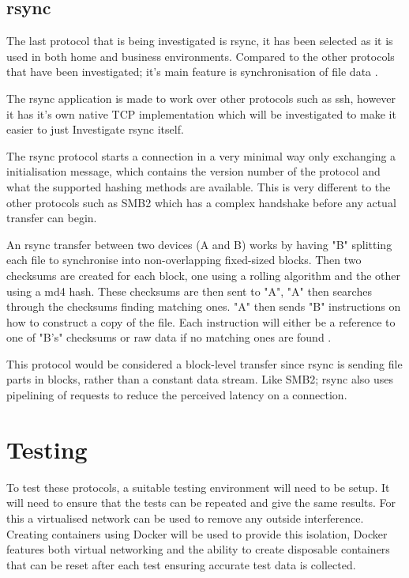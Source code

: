 \subsection*{rsync}
The last protocol that is being investigated is rsync, it has been selected as it is used in both home and business environments. Compared to the other protocols that have been investigated; it's main feature is synchronisation of file data \parencite{rsync-samba}.

The rsync application is made to work over other protocols such as ssh, however it has it's own native TCP implementation which will be investigated to make it easier to just Investigate rsync itself.

The rsync protocol starts a connection in a very minimal way only exchanging a initialisation message, which contains the version number of the protocol and what the supported hashing methods are available. This is very different to the other protocols such as SMB2 which has a complex handshake before any actual transfer can begin.

An rsync transfer between two devices (A and B) works by having "B" splitting each file to synchronise into non-overlapping fixed-sized blocks. Then two checksums are created for each block, one using a rolling algorithm and the other using a md4 hash. These checksums are then sent to "A", "A" then searches through the checksums finding matching ones. "A" then sends "B" instructions on how to construct a copy of the file. Each instruction will either be a reference to one of "B's" checksums or raw data if no matching ones are found \parencite{tridgell1996rsync}.


This protocol would be considered a block-level transfer since rsync is sending file parts in blocks, rather than a constant data stream. Like SMB2; rsync also uses pipelining of requests to reduce the perceived latency on a connection.


\section{Testing}
To test these protocols, a suitable testing environment will need to be setup. It will need to ensure that the tests can be repeated and give the same results. For this a virtualised network can be used to remove any outside interference. Creating containers using Docker will be used to provide this isolation, Docker features both virtual networking and the ability to create disposable containers that can be reset after each test ensuring accurate test data is collected.

